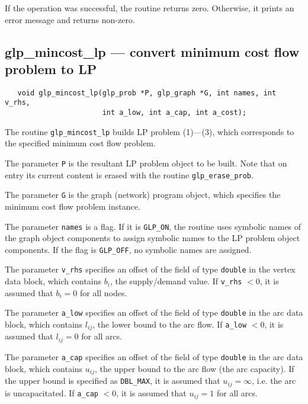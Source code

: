 \documentclass[11pt]{report}
\def\para#1{\noindent{\bf#1}}
\def\synopsis{\para{Synopsis}}
\def\description{\para{Description}}
\begin{document}
If the operation was successful, the routine returns zero. Otherwise,
it prints an error message and returns non-zero.


\subsection{glp\_mincost\_lp --- convert minimum cost flow problem
to LP}

\synopsis

\begin{verbatim}
   void glp_mincost_lp(glp_prob *P, glp_graph *G, int names, int v_rhs,
                       int a_low, int a_cap, int a_cost);
\end{verbatim}

\description

The routine \verb|glp_mincost_lp| builds LP problem (1)---(3), which
corresponds to the specified minimum cost flow problem.

The parameter \verb|P| is the resultant LP problem object to be built.
Note that on entry its current content is erased with the routine
\verb|glp_erase_prob|.

The parameter \verb|G| is the graph (network) program object, which
specifies the minimum cost flow problem instance.

The parameter \verb|names| is a flag. If it is \verb|GLP_ON|, the
routine uses symbolic names of the graph object components to assign
symbolic names to the LP problem object components. If the flag is
\verb|GLP_OFF|, no symbolic names are assigned.

The parameter \verb|v_rhs| specifies an offset of the field of type
\verb|double| in the vertex data block, which contains $b_i$, the
supply/demand value. If \verb|v_rhs| $<0$, it is assumed that $b_i=0$
for all nodes.

The parameter \verb|a_low| specifies an offset of the field of type
\verb|double| in the arc data block, which contains $l_{ij}$, the lower
bound to the arc flow. If \verb|a_low| $<0$, it is assumed that
$l_{ij}=0$ for all arcs.

The parameter \verb|a_cap| specifies an offset of the field of type
\verb|double| in the arc data block, which contains $u_{ij}$, the upper
bound to the arc flow (the arc capacity). If the upper bound is
specified as \verb|DBL_MAX|, it is assumed that $u_{ij}=\infty$, i.e.
the arc is uncapacitated. If \verb|a_cap| $<0$, it is assumed that
$u_{ij}=1$ for all arcs.
\end{document}

